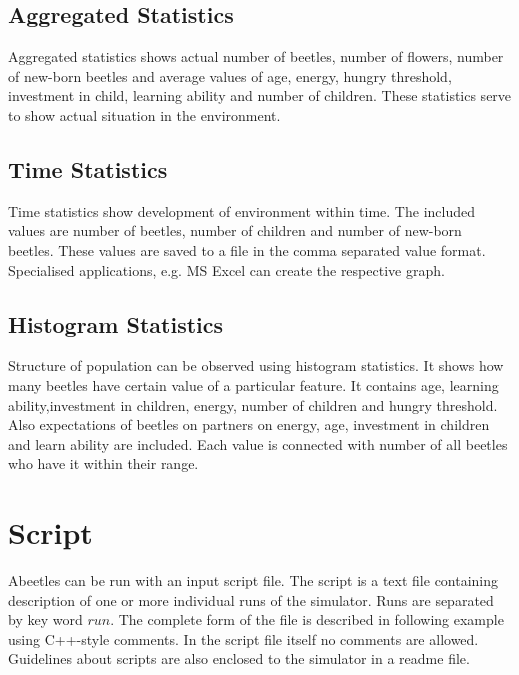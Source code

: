 \documentclass[a4paper,12pt]{report}
\begin{document}
\subsection {Aggregated Statistics}
Aggregated statistics shows actual number of beetles, number of flowers, number of new-born beetles and average values of age, energy, hungry threshold, investment in child, learning ability and number of children. These statistics serve to show actual situation in the environment.
\subsection{Time Statistics}
Time statistics show development of environment within time. The included values are number of beetles, number of children and number of new-born beetles.
These values are saved to a file in the comma separated value format. Specialised applications, e.g. MS Excel can create the respective graph. 
\subsection {Histogram Statistics}
Structure of population can be observed using histogram statistics. It shows how many beetles have certain value of a particular feature. It contains age, learning ability,investment in children, energy, number of children and hungry threshold. Also expectations of beetles on partners on energy, age, investment in children and learn ability are included. Each value is connected with number of all beetles who have it within their range. 

\section{Script}

Abeetles can be run with an input script file. The script is a text file containing description of one or more individual runs of the simulator. Runs are separated by key word $run$. The complete form of the file is described in following example using C++-style comments. In the script file itself no comments are allowed. Guidelines about scripts are also enclosed to the simulator in a readme file.

\end{document}
